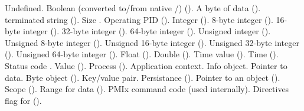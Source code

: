 \begin{constantdesc}
%
Undefined.
%
Boolean (converted to/from native /) ().
%
A byte of data ().
%
 terminated string ().
%
Size .
%
Operating \ac{PID} ().
%
Integer ().
%
8-byte integer ().
%
16-byte integer ().
%
32-byte integer ().
%
64-byte integer ().
%
Unsigned integer ().
%
Unsigned 8-byte integer ().
%
Unsigned 16-byte integer ().
%
Unsigned 32-byte integer ().
%
Unsigned 64-byte integer ().
%
Float ().
%
Double ().
%
Time value ().
%
Time ().
%
Status code {}.
%
Value ().
%
Process ().
%
Application context.
%
Info object.
%
Pointer to data.
%
Byte object ().
%
Key/value pair.
%
Persistance ().
%
Pointer to an object ().
%
Scope ().
%
Range for data ().
%
PMIx command code (used internally).
%
Directives flag for  ().

\end{constantdesc}
